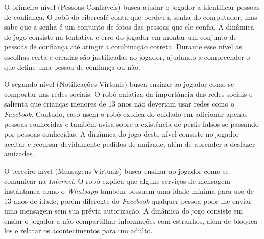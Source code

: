 O primeiro nível (Pessoas Confiáveis) busca ajudar o jogador a identificar pessoas de confiança. O robô do cibercafé conta que perdeu a senha do computador, mas sabe que a senha é um conjunto de fotos das pessoas que ele confia. A dinâmica de jogo consiste na tentativa e erro do jogador em montar um conjunto de pessoas de confiança até atingir a combinação correta. Durante esse nível as escolhas certa e erradas são justificadas ao jogador, ajudando a compreender o que define uma pessoa de confiança ou não. 

O segundo nível (Notificações Virtuais) busca ensinar ao jogador como se comportar nas redes sociais. O robô enfatiza da importância das redes sociais e salienta que crianças menores de 13 anos não deveriam usar redes como o \textit{Facebook}. Contudo, caso usem o robô explica do cuidado em adicionar apenas pessoas conhecidas e também avisa sobre a existência de perfis falsos se passando por pessoas conhecidas. A dinâmica do jogo deste nível consiste no jogador aceitar e recursar devidamente pedidos de amizade, além de aprender a desfazer amizades. %

O terceiro nível (Mensagens Virtuais) busca ensinar ao jogador como se comunicar na \textit{Internet}. O robô explica que alguns serviços de mensagem instântanea como o \textit{Whatsapp} também possuem uma idade mínima para uso de 13 anos de idade, porém diferente do \textit{Facebook} qualquer pessoa pode lhe enviar uma mensagem sem sua prévia autorização. A dinâmica do jogo consiste em ensiar o jogador a não compartilhar informações com estranhos, além de bloquea-los e relatar os acontecimentos para um adulto. %

